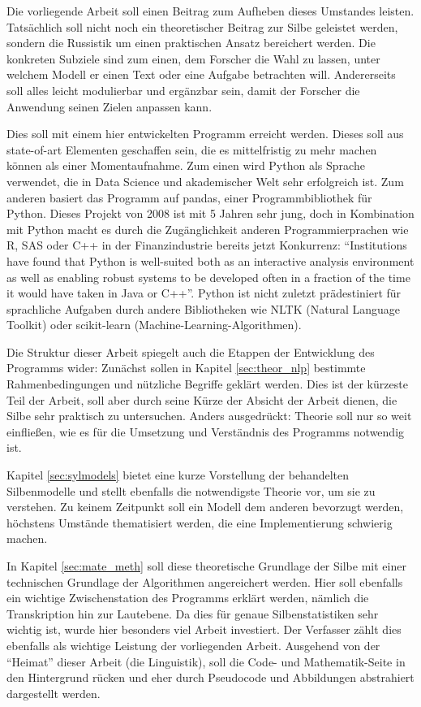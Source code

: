 \documentclass[12pt,headsepline,a4paper]{scrartcl}
\begin{document}
Die vorliegende Arbeit soll einen Beitrag zum Aufheben dieses Umstandes leisten. Tatsächlich soll nicht noch ein theoretischer Beitrag zur Silbe geleistet werden, sondern die Russistik um einen praktischen Ansatz bereichert werden. Die konkreten Subziele sind zum einen, dem Forscher die Wahl zu lassen, unter welchem Modell er einen Text oder eine Aufgabe betrachten will. Andererseits soll alles leicht modulierbar und ergänzbar sein, damit der Forscher die Anwendung seinen Zielen anpassen kann.

Dies soll mit einem hier entwickelten Programm erreicht werden. Dieses soll aus state-of-art Elementen geschaffen sein, die es mittelfristig zu mehr machen können als einer Momentaufnahme. Zum einen wird Python als Sprache verwendet, die in Data Science und akademischer Welt sehr erfolgreich ist. Zum anderen basiert das Programm auf pandas, einer Programmbibliothek für Python. Dieses Projekt von 2008 ist mit 5 Jahren sehr jung, doch in Kombination mit Python macht es durch die Zugänglichkeit anderen Programmierprachen wie R, SAS oder C++ in der Finanzindustrie bereits jetzt Konkurrenz: "`Institutions have found that Python is well-suited both
as an interactive analysis environment as well as enabling robust systems to be developed
often in a fraction of the time it would have taken in Java or C++"'\autocite[329]{mckinney2012}. Python ist nicht zuletzt prädestiniert für sprachliche Aufgaben durch andere Bibliotheken wie NLTK (Natural Language Toolkit) oder scikit-learn (Machine-Learning-Algorithmen).

Die Struktur dieser Arbeit spiegelt auch die Etappen der Entwicklung des Programms wider: Zunächst sollen in Kapitel \ref{sec:theor_nlp} bestimmte Rahmenbedingungen und nützliche Begriffe geklärt werden. Dies ist der kürzeste Teil der Arbeit, soll aber durch seine Kürze der Absicht der Arbeit dienen, die Silbe sehr praktisch zu untersuchen. Anders ausgedrückt: Theorie soll nur so weit einfließen, wie es für die Umsetzung und Verständnis des Programms notwendig ist. 

Kapitel \ref{sec:sylmodels} bietet eine kurze Vorstellung der behandelten Silbenmodelle und stellt ebenfalls die notwendigste Theorie vor, um sie zu verstehen. Zu keinem Zeitpunkt soll ein Modell dem anderen bevorzugt werden, höchstens Umstände thematisiert werden, die eine Implementierung schwierig machen.

In Kapitel \ref{sec:mate_meth} soll diese theoretische Grundlage der Silbe mit einer technischen Grundlage der Algorithmen angereichert werden. Hier soll ebenfalls ein wichtige Zwischenstation des Programms erklärt werden, nämlich die Transkription hin  zur Lautebene. Da dies für genaue Silbenstatistiken sehr wichtig ist, wurde hier besonders viel Arbeit investiert. Der Verfasser zählt dies ebenfalls als wichtige Leistung der vorliegenden Arbeit. Ausgehend von der "`Heimat"' dieser Arbeit (die Linguistik), soll die Code- und Mathematik-Seite in den Hintergrund rücken und eher durch Pseudocode und Abbildungen abstrahiert dargestellt werden.
\end{document}
